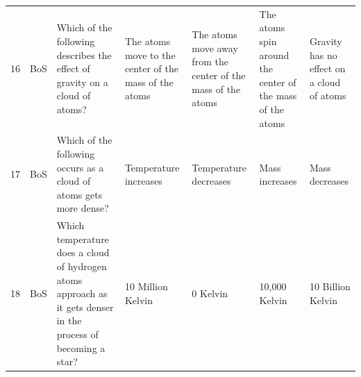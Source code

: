 \documentclass[10pt]{article}
\begin{document}
\begin{tiny}
\begin{longtable}{r P{0.3in} P{1.203in} P{0.8in} P{0.8in} P{0.8in} P{0.8in}}
    16    &     BoS &                                                                                                                                                                                                      Which of the following describes the effect of gravity on a cloud of atoms? &                                                                                 The atoms move to the center of the mass of the atoms &                                          The atoms move away from the center of the mass of the atoms &                                                                  The atoms spin around the center of the mass of the atoms &                                                                                         Gravity has no effect on a cloud of atoms \\
    17    &     BoS &                                                                                                                                                                                                               Which of the following occurs as a cloud of atoms gets more dense? &                                                                                                                 Temperature increases &                                                                                 Temperature decreases &                                                                                                             Mass increases &                                                                                                                    Mass decreases \\
    18    &     BoS &                                                                                                                                                                   Which temperature does a cloud of hydrogen atoms approach as it gets denser in the process of becoming a star? &                                                                                                                     10 Million Kelvin &                                                                                              0 Kelvin &                                                                                                              10,000 Kelvin &                                                                                                                 10 Billion Kelvin \\

\end{longtable}
\end{tiny}
\end{document}
